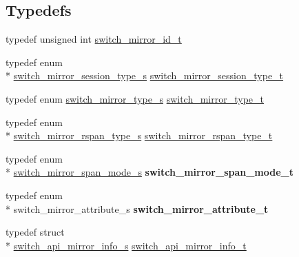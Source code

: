 \subsection*{Typedefs}
\begin{DoxyCompactItemize}
\item 
typedef unsigned int \hyperlink{group__Mirror_gaf5ec4a656bd46aede10f08c5dfd3a09c}{switch\+\_\+mirror\+\_\+id\+\_\+t}
\item 
typedef enum \\*
\hyperlink{group__Mirror_ga74ee0e13e7534b52d540c6b4dcc85249}{switch\+\_\+mirror\+\_\+session\+\_\+type\+\_\+s} \hyperlink{group__Mirror_ga0ae970af72459bcb4f7baee3d004bbca}{switch\+\_\+mirror\+\_\+session\+\_\+type\+\_\+t}
\item 
typedef enum \hyperlink{group__Mirror_ga58d4e2d8a2e2b8efebe22d1adbdd0f2e}{switch\+\_\+mirror\+\_\+type\+\_\+s} \hyperlink{group__Mirror_gab7f122c0c6b29dbe9f63ceea0603a2c9}{switch\+\_\+mirror\+\_\+type\+\_\+t}
\item 
typedef enum \\*
\hyperlink{group__Mirror_ga2123897bf0979e5bfd4b1388faef95ff}{switch\+\_\+mirror\+\_\+rspan\+\_\+type\+\_\+s} \hyperlink{group__Mirror_gaca455b8eb6709bf2398d9565dd2afb73}{switch\+\_\+mirror\+\_\+rspan\+\_\+type\+\_\+t}
\item 
\hypertarget{group__Mirror_ga3da5335d1589bb356fa7e4314561c551}{typedef enum \\*
\hyperlink{group__Mirror_ga2079fb7f359b736e7452ee4ef9064414}{switch\+\_\+mirror\+\_\+span\+\_\+mode\+\_\+s} {\bfseries switch\+\_\+mirror\+\_\+span\+\_\+mode\+\_\+t}}\label{group__Mirror_ga3da5335d1589bb356fa7e4314561c551}

\item 
\hypertarget{group__Mirror_ga73953aedab3864ff0c369cbfdc8d8ecc}{typedef enum \\*
switch\+\_\+mirror\+\_\+attribute\+\_\+s {\bfseries switch\+\_\+mirror\+\_\+attribute\+\_\+t}}\label{group__Mirror_ga73953aedab3864ff0c369cbfdc8d8ecc}

\item 
typedef struct \\*
\hyperlink{structswitch__api__mirror__info__s}{switch\+\_\+api\+\_\+mirror\+\_\+info\+\_\+s} \hyperlink{group__Mirror_gac1b339df3793f4dfdd6603bb17b36f0a}{switch\+\_\+api\+\_\+mirror\+\_\+info\+\_\+t}
\end{DoxyCompactItemize}
